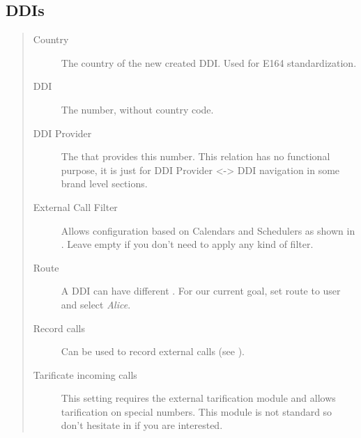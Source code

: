 \documentclass[letterpaper,10pt,spanish]{sphinxmanual}
\begin{document}
\subsection{DDIs}
\label{administration_portal/client/vpbx/ddis:ddis}\label{administration_portal/client/vpbx/ddis::doc}\label{administration_portal/client/vpbx/ddis:pbx-ddis}\begin{quote}
\begin{description}
\item[{Country}] \leavevmode
The country of the new created DDI. Used for E164 standardization.

\item[{DDI}] \leavevmode
The number, without country code.

\item[{DDI Provider}] \leavevmode
The {\hyperref[administration_portal/brand/providers/ddi_providers:ddi\string-providers]{}} that provides this number. This relation has no functional purpose, it
is just for DDI Provider \textless{}-\textgreater{} DDI navigation in some brand level sections.

\item[{External Call Filter}] \leavevmode
Allows configuration based on Calendars and Schedulers as shown in
{\hyperref[administration_portal/client/vpbx/routing_tools/external_call_filters:external\string-call\string-filters]{}}. Leave empty if you don't need to apply any
kind of filter.

\item[{Route}] \leavevmode
A DDI can have different {\hyperref[administration_portal/client/vpbx/ddis:routing\string-logics]{}}. For our
current goal, set route to user and select \emph{Alice}.

\item[{Record calls}] \leavevmode
Can be used to record external calls (see {\hyperref[administration_portal/client/vpbx/calls/call_recordings:call\string-recordings]{}}).

\item[{Tarificate incoming calls}] \leavevmode
This setting requires the external tarification module and allows
tarification on special numbers. This module is not standard so don't
hesitate in {\hyperref[basic_concepts/intro/getting_help:getting\string-help]{}} if you are interested.

\end{description}
\end{quote}
\end{document}

